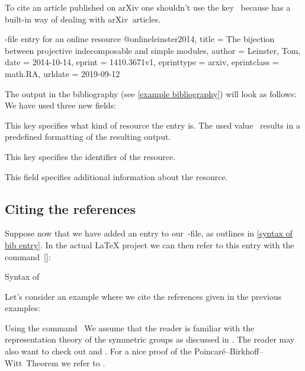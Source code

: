 To cite an article published on arXiv one shouldn’t use the key~ because  has a built-in way of dealing with arXiv~articles.
\begin{showcode}{-file entry for an online resource}
@online{leinster2014,
  title       = {The bijection between projective indecomposable and simple modules},
  author      = {Leinster, Tom},
  date        = {2014-10-14},
  eprint      = {1410.3671v1},
  eprinttype  = {arxiv},
  eprintclass = {math.RA},
  urldate     = {2019-09-12}
}
\end{showcode}
The output in the bibliography (see \cref{example bibliography}) will look as follows:
We have used three new fields:
\begin{mydescription}
  \item[\optname{eprinttype}]
    This key specifies what kind of resource the entry is.
    The used value~ results in a predefined formatting of the resulting output.
  \item[\optname{eprint}]
    This key specifies the identifier of the resource.
  \item[\optname{eprintclass}]
    This field specifies additional information about the resource.
\end{mydescription}





\subsection{Citing the references}

Suppose now that we have added an entry to our~-file, as outlines in \cref{syntax of bib entry}.
In the actual {\LaTeX} project we can then refer to this entry with the command~[\comname]:
\begin{showcode}{Syntax of }
\cite[details]{label}
\end{showcode}
Let’s consider an example where we cite the references given in the previous examples:
\begin{showlatex}[label = {using cite}]{Using the command~}
We assume that the reader is familiar with the representation theory of the symmetric groups as discussed in \cite[\S 4]{fultonharris2004}.
The reader may also want to check out \cite{benson1991} and \cite{cayley_graph}.
For a nice proof of the Poincaré--Birkhoff--Witt~Theorem we refer to \cite[\S 3]{diamond_lemma}.
\end{showlatex}

